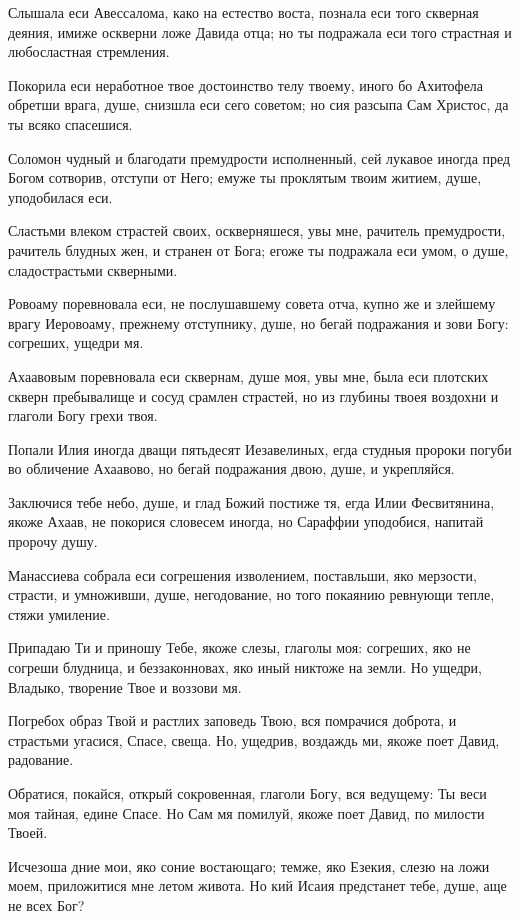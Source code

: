 Слышала еси Авессалома, како на естество воста, познала еси того скверная деяния, имиже оскверни ложе Давида отца; но ты подражала еси того страстная и любосластная стремления.


Покорила еси неработное твое достоинство телу твоему, иного бо Ахитофела обретши врага, душе, снизшла еси сего советом; но сия разсыпа Сам Христос, да ты всяко спасешися.


Соломон чудный и благодати премудрости исполненный, сей лукавое иногда пред Богом сотворив, отступи от Него; емуже ты проклятым твоим житием, душе, уподобилася еси.


Сластьми влеком страстей своих, оскверняшеся, увы мне, рачитель премудрости, рачитель блудных жен, и странен от Бога; егоже ты подражала еси умом, о душе, сладострастьми скверными.


Ровоаму поревновала еси, не послушавшему совета отча, купно же и злейшему врагу Иеровоаму, прежнему отступнику, душе, но бегай подражания и зови Богу: согреших, ущедри мя.


Ахаавовым поревновала еси сквернам, душе моя, увы мне, была еси плотских скверн пребывалище и сосуд срамлен страстей, но из глубины твоея воздохни и глаголи Богу грехи твоя.


Попали Илия иногда дващи пятьдесят Иезавелиных, егда студныя пророки погуби во обличение Ахаавово, но бегай подражания двою, душе, и укрепляйся.


Заключися тебе небо, душе, и глад Божий постиже тя, егда Илии Фесвитянина, якоже Ахаав, не покорися словесем иногда, но Сараффии уподобися, напитай пророчу душу.


Манассиева собрала еси согрешения изволением, поставльши, яко мерзости, страсти, и умноживши, душе, негодование, но того покаянию ревнующи тепле, стяжи умиление.


Припадаю Ти и приношу Тебе, якоже слезы, глаголы моя: согреших, яко не согреши блудница, и беззаконновах, яко иный никтоже на земли. Но ущедри, Владыко, творение Твое и воззови мя.


Погребох образ Твой и растлих заповедь Твою, вся помрачися доброта, и страстьми угасися, Спасе, свеща. Но, ущедрив, воздаждь ми, якоже поет Давид, радование.


Обратися, покайся, открый сокровенная, глаголи Богу, вся ведущему: Ты веси моя тайная, едине Спасе. Но Сам мя помилуй, якоже поет Давид, по милости Твоей.


Исчезоша дние мои, яко соние востающаго; темже, яко Езекия, слезю на ложи моем, приложитися мне летом живота. Но кий Исаия предстанет тебе, душе, аще не всех Бог?


